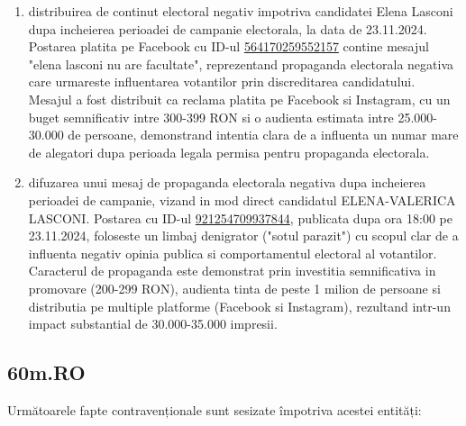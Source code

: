 \documentclass[a4paper,12pt]{article}
\begin{document}
\begin{enumerate}[leftmargin=*, label=\arabic*.)]
    \item distribuirea de continut electoral negativ impotriva candidatei Elena Lasconi dupa incheierea perioadei de campanie electorala, la data de 23.11.2024. Postarea platita pe Facebook cu ID-ul \href{https://www.facebook.com/ads/library/?id=564170259552157}{564170259552157} contine mesajul "elena lasconi nu are facultate", reprezentand propaganda electorala negativa care urmareste influentarea votantilor prin discreditarea candidatului. Mesajul a fost distribuit ca reclama platita pe Facebook si Instagram, cu un buget semnificativ intre 300-399 RON si o audienta estimata intre 25.000-30.000 de persoane, demonstrand intentia clara de a influenta un numar mare de alegatori dupa perioada legala permisa pentru propaganda electorala.
    \item difuzarea unui mesaj de propaganda electorala negativa dupa incheierea perioadei de campanie, vizand in mod direct candidatul ELENA-VALERICA LASCONI. Postarea cu ID-ul \href{https://www.facebook.com/ads/library/?id=921254709937844}{921254709937844}, publicata dupa ora 18:00 pe 23.11.2024, foloseste un limbaj denigrator ("sotul parazit") cu scopul clar de a influenta negativ opinia publica si comportamentul electoral al votantilor. Caracterul de propaganda este demonstrat prin investitia semnificativa in promovare (200-299 RON), audienta tinta de peste 1 milion de persoane si distributia pe multiple platforme (Facebook si Instagram), rezultand intr-un impact substantial de 30.000-35.000 impresii.
\end{enumerate}

\vspace{0.5cm}

\subsection{60m.RO}
Următoarele fapte contravenționale sunt sesizate împotriva acestei entități:
\end{document}
